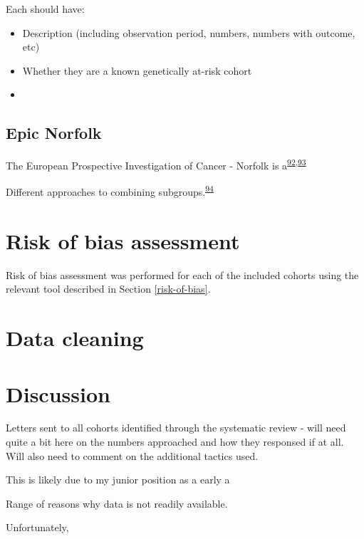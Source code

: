 \documentclass[a4paper, twoside]{templates/ociamthesis}
\providecommand{\tightlist}{%
  \setlength{\itemsep}{0pt}\setlength{\parskip}{0pt}}
\begin{document}
Each should have:

\begin{itemize}
\tightlist
\item
  Description (including observation period, numbers, numbers with outcome, etc)
\item
  Whether they are a known genetically at-risk cohort
\item
\end{itemize}

\hypertarget{epic-norfolk}{%
\subsection{Epic Norfolk}\label{epic-norfolk}}

The European Prospective Investigation of Cancer - Norfolk is a\textsuperscript{\protect\hyperlink{ref-riboli1997}{92},\protect\hyperlink{ref-riboli2002}{93}}

Different approaches to combining subgroups.\textsuperscript{\protect\hyperlink{ref-fisher2017}{94}}

\hypertarget{risk-of-bias-assessment}{%
\section{Risk of bias assessment}\label{risk-of-bias-assessment}}

Risk of bias assessment was performed for each of the included cohorts using the relevant tool described in Section \ref{risk-of-bias}.

\hypertarget{data-cleaning}{%
\section{Data cleaning}\label{data-cleaning}}

\hypertarget{discussion-3}{%
\section{Discussion}\label{discussion-3}}

Letters sent to all cohorts identified through the systematic review - will need quite a bit here on the numbers approached and how they responsed if at all. Will also need to comment on the additional tactics used.

This is likely due to my junior position as a early a

Range of reasons why data is not readily available.

Unfortunately,
\end{document}
